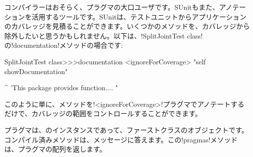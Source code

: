 \documentclass[a4paper,10pt,twoside]{book}
\begin{document}
コンパイラーはおそらく、プラグマの大口ユーザです。SUnitもまた、アノテーションを活用するツールです。SUnitは、テストユニットからアプリケーションのカバレッジを見積ることができます。いくつかのメソッドを、カバレッジから除外したいと思うかもしれません。以下は、\ct!SplitJointTest class!の\ct!documentation!メソッドの場合です:

\begin{code}{}
SplitJointTest class>>>documentation
	<ignoreForCoverage>
	"self showDocumentation"
	
	^ 'This package provides function.... "
\end{code}

このように単に、メソッドを\ct!<ignoreForCoverage>!プラグマでアノテートするだけで、カバレッジの範囲をコントロールすることができます。


%	


プラグマは、のインスタンスであって、ファーストクラスのオブジェクトです。コンパイル済みメソッドは、メッセージに答えます。この\ct!pragmas!メソッドは、プラグマの配列を返します。
\end{document}
